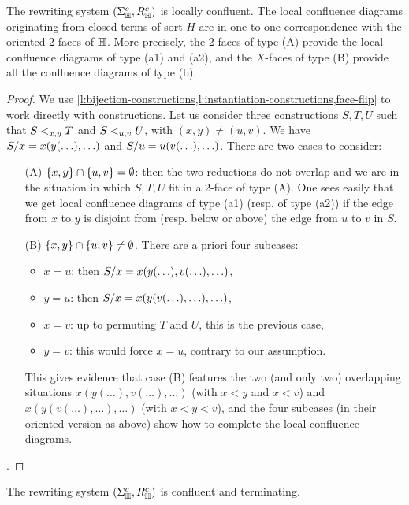 \begin{thm}
  \label{thm:critical-pairs} 
  The rewriting system $(\Sigma_{\mathbb H}^c,R_{\mathbb H}^c)$  is locally confluent. The local confluence diagrams originating from  closed terms of  sort $H$ 
 are in one-to-one correspondence with the oriented 2-faces of ${\mathbb H}$.
  More precisely, the 2-faces of type (A) provide  the local confluence diagrams of type (a1) and (a2),  and the $X$-faces of type (B) provide all  the confluence diagrams of type (b).
\end{thm}

\begin{proof}
  We use \cref{l:bijection-constructions,l:instantiation-constructions,face-flip} to work directly with constructions. 
Let us consider three constructions $S,T,U$ such that $S<_{x,y}T$ and $S <_{u,v} U$, with $(x,y)\neq(u,v)$.
  We have~$S/x=x(y(\ldots),\ldots)$ and $S/u=u(v(\ldots),\ldots)$. 
  There are two cases to consider:
  \begin{itemize}
  \item[(A)] $\left\{x,y\right\}\cap\left\{u,v\right\}=\emptyset$: then the two reductions do not overlap and we are in the situation in which $S,T,U$ fit in a 2-face of type (A).  One sees easily that we get local confluence diagrams of type (a1) (resp. of type (a2)) if the edge from $x$ to $y$ is disjoint from (resp. below or above) the edge  from $u$ to $v$ in $S$. 
  \item[(B)] $\left\{x,y\right\}\cap\left\{u,v\right\}\neq\emptyset$. 
  There are a priori four subcases:
  \begin{itemize}
  \item $x=u$: then $S/x=x(y(\ldots),v(\ldots),\ldots)$,
  \item $y=u$: then  $S/x=x(y(v(\ldots),\ldots),\ldots)$,
  \item $x=v$: up to permuting $T$ and $U$, this is the previous case,
  \item $y=v$: this would force $x=u$, contrary to our assumption.
  \end{itemize}
  This gives evidence that case (B) features the two (and only two) overlapping situations $x(y(\ldots),v(\ldots),\ldots)$ (with $x<y$ and $x<v$) and 
  $x(y(v(\ldots),\ldots),\ldots)$ (with $x<y<v$), and the four subcases  (in their oriented version as above) show how to complete the local confluence diagrams.  
\end{itemize}.
\end{proof}

\begin{thm}
  \label{thm:confluent}
  The rewriting system $(\Sigma_{\mathbb H}^c ,R_{\mathbb H}^c)$ is confluent and terminating.
\end{thm}

